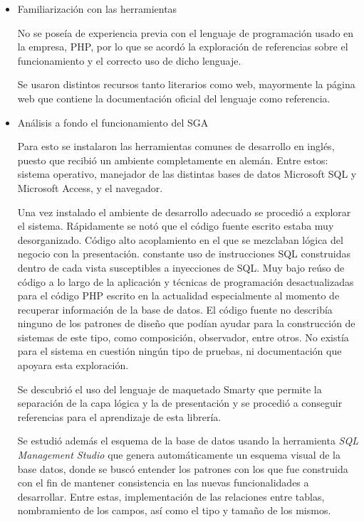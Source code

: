 \begin{itemize}
\item Familiarización con las herramientas

No se poseía de experiencia previa con el lenguaje de programación usado en la empresa, PHP, por lo que se acordó la exploración de referencias sobre el funcionamiento y el correcto uso de dicho lenguaje.

Se usaron distintos recursos tanto literarios como web, mayormente la página web que contiene la documentación oficial del lenguaje como referencia. \cite{bib:php}

\item Análisis a fondo el funcionamiento del SGA

Para esto se instalaron las herramientas comunes de desarrollo en inglés, puesto que recibió un ambiente completamente en alemán. Entre estos: sistema operativo, manejador de las distintas bases de datos Microsoft SQL y Microsoft Access, y el navegador.

Una vez instalado el ambiente de desarrollo adecuado se procedió a explorar el sistema. Rápidamente se notó que el código fuente escrito estaba muy desorganizado. Código alto acoplamiento en el que se mezclaban lógica del negocio con la presentación. constante uso de instrucciones \gls{SQL} construidas dentro de cada vista susceptibles a inyecciones de \gls{SQL}. Muy bajo reúso de código a lo largo de la aplicación y técnicas de programación desactualizadas para el código PHP escrito en la actualidad especialmente al momento de recuperar información de la base de datos. El código fuente no describía ninguno de los patrones de diseño que podían ayudar para la construcción de sistemas de este tipo, como composición, observador, entre otros. No existía para el sistema en cuestión ningún tipo de pruebas, ni documentación que apoyara esta exploración.

Se descubrió el uso del lenguaje de maquetado Smarty que permite la separación de la capa lógica y la de presentación y se procedió a conseguir referencias para el aprendizaje de esta librería.

Se estudió además el esquema de la base de datos usando la herramienta \emph{SQL Management Studio} que genera automáticamente un esquema visual de la base datos, donde se buscó entender los patrones con los que fue construida con el fin de mantener consistencia en las nuevas funcionalidades a desarrollar. Entre estas, implementación de las relaciones entre tablas, nombramiento de los campos, así como el tipo y tamaño de los mismos.


\end{itemize}
